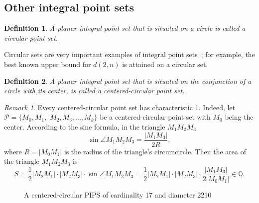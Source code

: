 \documentclass[12pt]{article}
\theoremstyle{theorem}
\theoremstyle{dfn}
\newtheorem{dfn}{Definition}
\theoremstyle{remark}
\newtheorem{remark}{Remark}
\begin{document}


\subsection{Other integral point sets}

\begin{dfn}
	A planar integral point set that is situated on a circle is called a \textit{circular}
	point set.
\end{dfn}

Circular sets are very important examples
of integral point sets~\cite{harborth1993upper,piepmeyer1996maximum,bat2018number};
for example, the best known upper bound for $d(2,n)$
is attained on a circular set.


\begin{dfn}
	A planar integral point set that is situated on the conjunction of a circle with its center,
	is called a \textit{centered-circular} point set.
\end{dfn}

\begin{remark}
	Every centered-circular point set has characteristic 1.
	Indeed, let $\mathcal{P} = \{M_0, M_1,$ $ M_2, M_3, ..., M_k\}$ be a centered-circular point set
	with $M_0$ being the center.
	According to the sine formula, in the triangle $M_1 M_2 M_3$
	\begin{equation}
		\sin \angle M_1 M_2 M_3 = \frac{|M_1M_3|}{2R}
		,
	\end{equation}
	where $R = |M_0 M_1| $ is the radius of the triangle's circumcircle.
	Then the area of the triangle $M_1 M_2 M_3$ is
	\begin{equation}
		S = \frac12 |M_2 M_1| \cdot |M_2 M_3| \cdot \sin \angle M_1 M_2 M_3 =
		\frac12 |M_2 M_1| \cdot |M_2 M_3| \cdot \frac{|M_1M_3|}{2|M_0 M_1|} \in\mathbb Q
		.
	\end{equation}
\end{remark}

\begin{figure}[h!]
\parbox{0.7\linewidth}{\caption{A centered-circular PIPS of cardinality 17 and diameter 2210}
\label{17_2210_1_acc4a56887abb3c3a315712ea083f0e7_centered_circle.png}}
\end{figure}
\end{document}
